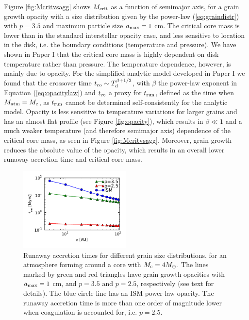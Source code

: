 \documentclass[apj]{emulateapj}
\newcommand{\co}{_{\rm c}}
\begin{document}
Figure \ref{fig:Mcritvsagg} shows $M_{\rm crit}$ as a function of semimajor axis, for a grain growth opacity with a size distribution given by the power-law (\ref{eq:graindistr}) with $p=3.5$ and maximum particle size $a_{\rm max}=1$ cm. The critical core mass is lower than in the standard interstellar opacity case, and less sensitive to location in the disk, i.e. the boundary conditions (temperature and pressure). We have shown in Paper I that the critical core mass is highly dependent on disk temperature rather than pressure. The temperature dependence, however, is mainly due to opacity. For the simplified analytic model developed in Paper I we found that the crossover time $t_{\rm co} \sim T_{\rm d}^{\beta+1/2}$, with $\beta$ the power-law exponent in Equation (\ref{eq:opacitylaw}) and $t_{\rm co}$ a proxy for $t_{\rm run}$, defined as the time when $M_{\rm atm}=M\co$, as $t_{\rm run}$ cannot be determined self-consistently for the analytic model. Opacity is less sensitive to temperature variations for larger grains and has an almost flat profile (see Figure \ref{fig:opacity}), which results in $\beta \ll 1$ and a much weaker temperature (and therefore semimajor axis) dependence of the critical core mass, as seen in Figure \ref{fig:Mcritvsagg}. Moreover, grain growth reduces the absolute value of the opacity, which results in an overall lower runaway accretion time and critical core mass. %

\begin{figure}[h!]
\centering
\includegraphics[width=0.5\textwidth]{../../figs/ModelAtmospheres/RadSelfGravRealEOS/PaperFigs/tco_vs_a_Mc4_comp.pdf}
\caption{Runaway accretion times for different grain size distributions, for an atmosphere forming around a core with $M\co=4 M_{\oplus}$. The lines marked by green and red triangles have grain growth opacities with $a_{\rm max}=1$ cm, and $p=3.5$ and $p=2.5$, respectively (see text for details). The blue circle line has an ISM power-law opacity. The runaway accretion time is more than one order of magnitude lower when coagulation is accounted for, i.e. $p=2.5$.}
\label{fig:p25p35}
\end{figure}
\end{document}
